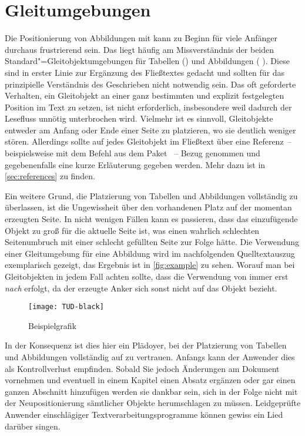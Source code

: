 \documentclass[%
  english,ngerman,%
  geometry=no,DIV=12,automark,%
]{tudscrartcl}
\begin{document}
\section{Gleitumgebungen}
\label{sec:floats}
Die Positionierung von Abbildungen mit  kann zu Beginn für viele 
Anfänger durchaus frustrierend sein. Das liegt häufig am Missverständnis der 
beiden Standard"=Gleitobjektumgebungen für Tabellen () und 
Abbildungen ( ). Diese sind in erster Linie zur Ergänzung 
des Fließtextes gedacht und sollten für das prinzipielle Verständnis des 
Geschrieben nicht notwendig sein. Das oft geforderte Verhalten, ein Gleitobjekt 
an einer ganz bestimmten und explizit festgelegten Position im Text zu setzen, 
ist nicht erforderlich, insbesondere weil dadurch der Lesefluss unnötig 
unterbrochen wird. Vielmehr ist es sinnvoll, Gleitobjekte entweder am Anfang 
oder Ende einer Seite zu platzieren, wo sie deutlich weniger stören. Allerdings 
sollte auf jedes Gleitobjekt im Fließtext über eine Referenz~-- beispielsweise 
mit dem Befehl  aus dem Paket ~-- Bezug 
genommen und gegebenenfalls eine kurze Erläuterung gegeben werden. Mehr dazu 
ist in \autoref{sec:references} zu finden.

Ein weitere Grund,  die Platzierung von Tabellen und Abbildungen 
vollständig zu überlassen, ist die Ungewissheit über den vorhandenen Platz auf 
der momentan erzeugten Seite. In nicht wenigen Fällen kann es passieren, dass 
das einzufügende Objekt zu groß für die aktuelle Seite ist, was einen wahrlich 
schlechten Seitenumbruch mit einer schlecht gefüllten Seite zur Folge hätte.
Die Verwendung einer Gleitumgebung für eine Abbildung wird im nachfolgenden 
Quelltextauszug exemplarisch gezeigt, das Ergebnis ist in \autoref{fig:example} 
zu sehen. Worauf man bei Gleitobjekten in jedem Fall achten sollte, dass die 
Verwendung von  immer erst \emph{nach}  erfolgt, da 
der erzeugte Anker sich sonst nicht auf das Objekt bezieht.
%
\begin{Excerpt*}
\begin{figure}
\centering
\texttt{[image: TUD-black]}
\caption{Beispielgrafik}\label{fig:example}
\end{figure}
\end{Excerpt*}
\InputExcerpt
%
In der Konsequenz ist dies hier ein Plädoyer, bei der Platzierung von Tabellen 
und Abbildungen vollständig auf  zu vertrauen. Anfangs kann der 
Anwender dies als Kontrollverlust empfinden. Sobald Sie jedoch Änderungen am 
Dokument vornehmen und eventuell in einem Kapitel einen Absatz ergänzen oder 
gar einen ganzen Abschnitt hinzufügen werden sie dankbar sein, sich in der 
Folge nicht mit der Neupositionierung sämtlicher Objekte herumschlagen zu 
müssen. Leidgeprüfte Anwender einschlägiger Textverarbeitungsprogramme können 
gewiss ein Lied darüber singen.
\end{document}
